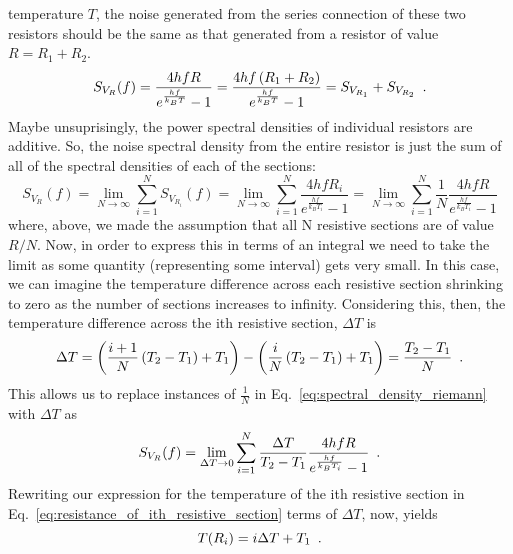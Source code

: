 \documentclass{article}
\begin{document}
temperature $ T $, the noise generated from the series connection of these two
resistors should be the same as that generated from a resistor of value $ R =
R_{1} + R_{2} $.
\begin{equation}
   S_{V_{R}}(f) = \frac{4 h f R}{e^{\frac{hf}{k_{B}T}}-1}=
   \frac{4 h f \left( R_{1} + R_{2} \right)}{e^{\frac{hf}{k_{B}T}}-1}
   = S_{V_{R_{1}}} + S_{V_{R_{2}}} \enskip.
\end{equation}
Maybe unsuprisingly, the power spectral densities of individual resistors are
additive. So, the noise spectral density from the entire resistor is just the
sum of all of the spectral densities of each of the sections:
\begin{equation}
   S_{V_{R}}(f) = \lim_{N \rightarrow \infty}\sum^{N}_{i=1}
   S_{V_{R_{i}}}(f)
   = \lim_{N \rightarrow \infty}\sum^{N}_{i=1} \frac{4 h f
   R_{i}}{e^{\frac{hf}{k_{B}T_{i}}}-1}
   = \lim_{N \rightarrow \infty}\sum^{N}_{i=1}\frac{1}{N} \frac{4 h f
   R}{e^{\frac{hf}{k_{B}T_{i}}}-1} \label{eq:spectral_density_riemann}
\end{equation}
where, above, we made the assumption that all N resistive sections are of value $
R/N$. Now, in order to express this in terms of an integral we need to take the
limit as some quantity (representing some interval) gets very small. In this
case, we can imagine the temperature difference across each resistive section
shrinking to zero as the number of sections increases to infinity. Considering
this, then, the temperature difference across the ith resistive section, $
\Delta T $ is
\begin{equation}
   \Delta T = \left(\frac{i+1}{N} \left( T_{2} - T_{1} \right) + T_{1}\right) - \left( \frac{i}{N}
\left( T_{2} - T_{1} \right) + T_{1} \right) = \frac{T_{2} - T_{1}}{N} \enskip.
\end{equation}
This allows us to replace instances of $ \frac{1}{N} $ in
Eq.~\ref{eq:spectral_density_riemann} with $ \Delta T $ as
\begin{equation}
   S_{V_{R}}(f) = \lim_{\Delta T \rightarrow 0}\sum^{N}_{i=1} \frac{\Delta
   T}{T_{2} - T_{1}}\frac{4 h f R}{e^{\frac{hf}{k_{B}T_{i}}}-1} \enskip.
   \label{eq:spectral_density_intermediate_form}
\end{equation}
Rewriting our expression for the temperature of the ith resistive section in
Eq.~\ref{eq:resistance_of_ith_resistive_section} terms of $ \Delta T $, now,
yields
\begin{equation}
   T(R_{i}) = i\Delta T +T_{1} \enskip.
\end{equation}
\end{document}
